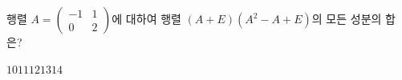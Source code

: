 \hspace*{2mm}\begin{minipage}[t]{\dimexpr\linewidth-2mm\relax}\vspace{0pt}
행렬 $A=\begin{pmatrix} -1 & 1 \\ 0 & 2 \end{pmatrix}$에 대하여 행렬 $(A+E)(A^2-A+E)$의 모든 성분의 합은? 
\begin{choices32}{$10$}{$11$}{$12$}{$13$}{$14$}\end{choices32}\end{minipage}
